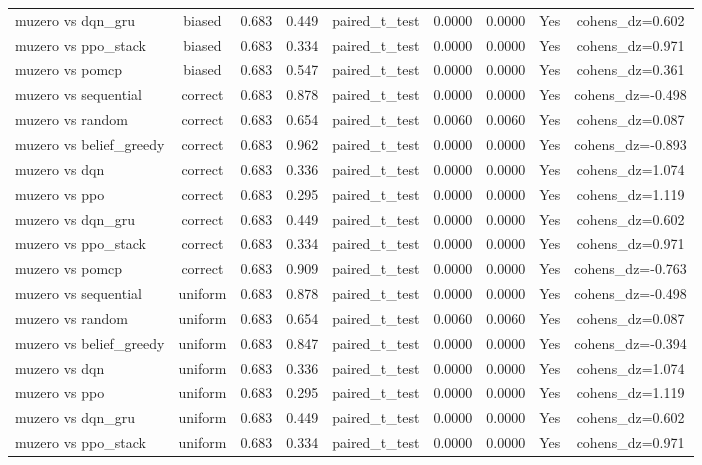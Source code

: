 \begin{table}[htbp]
\begin{tabular}{lcccccccc}
muzero vs dqn_gru & biased & 0.683 & 0.449 & paired_t_test & 0.0000 & 0.0000 & Yes & cohens_dz=0.602 \\
muzero vs ppo_stack & biased & 0.683 & 0.334 & paired_t_test & 0.0000 & 0.0000 & Yes & cohens_dz=0.971 \\
muzero vs pomcp & biased & 0.683 & 0.547 & paired_t_test & 0.0000 & 0.0000 & Yes & cohens_dz=0.361 \\
muzero vs sequential & correct & 0.683 & 0.878 & paired_t_test & 0.0000 & 0.0000 & Yes & cohens_dz=-0.498 \\
muzero vs random & correct & 0.683 & 0.654 & paired_t_test & 0.0060 & 0.0060 & Yes & cohens_dz=0.087 \\
muzero vs belief_greedy & correct & 0.683 & 0.962 & paired_t_test & 0.0000 & 0.0000 & Yes & cohens_dz=-0.893 \\
muzero vs dqn & correct & 0.683 & 0.336 & paired_t_test & 0.0000 & 0.0000 & Yes & cohens_dz=1.074 \\
muzero vs ppo & correct & 0.683 & 0.295 & paired_t_test & 0.0000 & 0.0000 & Yes & cohens_dz=1.119 \\
muzero vs dqn_gru & correct & 0.683 & 0.449 & paired_t_test & 0.0000 & 0.0000 & Yes & cohens_dz=0.602 \\
muzero vs ppo_stack & correct & 0.683 & 0.334 & paired_t_test & 0.0000 & 0.0000 & Yes & cohens_dz=0.971 \\
muzero vs pomcp & correct & 0.683 & 0.909 & paired_t_test & 0.0000 & 0.0000 & Yes & cohens_dz=-0.763 \\
muzero vs sequential & uniform & 0.683 & 0.878 & paired_t_test & 0.0000 & 0.0000 & Yes & cohens_dz=-0.498 \\
muzero vs random & uniform & 0.683 & 0.654 & paired_t_test & 0.0060 & 0.0060 & Yes & cohens_dz=0.087 \\
muzero vs belief_greedy & uniform & 0.683 & 0.847 & paired_t_test & 0.0000 & 0.0000 & Yes & cohens_dz=-0.394 \\
muzero vs dqn & uniform & 0.683 & 0.336 & paired_t_test & 0.0000 & 0.0000 & Yes & cohens_dz=1.074 \\
muzero vs ppo & uniform & 0.683 & 0.295 & paired_t_test & 0.0000 & 0.0000 & Yes & cohens_dz=1.119 \\
muzero vs dqn_gru & uniform & 0.683 & 0.449 & paired_t_test & 0.0000 & 0.0000 & Yes & cohens_dz=0.602 \\
muzero vs ppo_stack & uniform & 0.683 & 0.334 & paired_t_test & 0.0000 & 0.0000 & Yes & cohens_dz=0.971 \\

\end{tabular}
\end{table}
